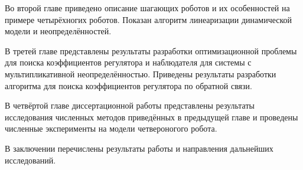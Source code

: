 Во второй главе приведено описание шагающих роботов и их особенностей на примере четырёхногих роботов. Показан алгоритм линеаризации динамической модели и неопределённостей.

В третей главе представлены результаты разработки оптимизационной проблемы для поиска коэффициентов регулятора и наблюдателя для системы с мультипликативной неопределённостью. Приведены результаты разработки алгоритма для поиска коэффициентов регулятора по обратной связи.

В четвёртой главе диссертационной работы представлены результаты исследования численных методов приведённых в предыдущей главе и проведены численные эксперименты на модели четвероногого робота.

В заключении перечислены результаты работы и направления дальнейших исследований.